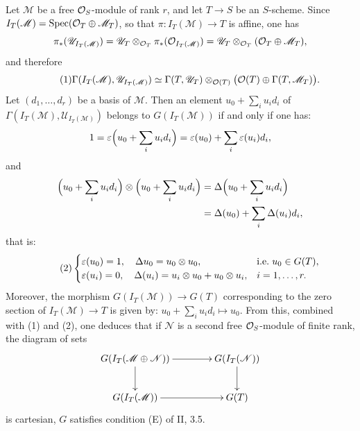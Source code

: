 Let $\mathscr M$ be a free $\mathcal{O}_S$-module of rank $r$, and let $T\to S$ be an $S$-scheme. Since $I_T(\mathscr M)=\operatorname{Spec}(\mathcal{O}_T\oplus\mathscr M_T)$, so that $\pi:I_T(\mathscr M)\to T$ is affine, one has
\[
\pi_*(\mathscr U_{I_T(\mathscr M)})=\mathscr U_T\otimes_{\mathcal{O}_T}\pi_*(\mathcal{O}_{I_T(\mathscr M)})=\mathscr U_T\otimes_{\mathcal{O}_T}(\mathcal{O}_T\oplus\mathscr M_T),
\]
and therefore
\begin{equation}\tag{1}
\Gamma(I_T(\mathscr M),\mathscr U_{I_T(\mathscr M)})\simeq\Gamma(T,\mathscr U_T)\otimes_{\mathcal{O}(T)}\bigl(\mathcal{O}(T)\oplus\Gamma(T,\mathscr M_T)\bigr).
\end{equation}
Let $(d_1,\ldots,d_r)$ be a basis of $\mathscr M$. Then an element $u_0+\sum_i u_id_i$ of $\Gamma(I_T(\mathscr M),\mathscr U_{I_T(\mathscr M)})$ belongs to $G(I_T(\mathscr M))$ if and only if one has:
\[
1=\varepsilon\Bigl(u_0+\sum_i u_id_i\Bigr)=\varepsilon(u_0)+\sum_i\varepsilon(u_i)d_i,
\]
and
\[
\begin{aligned}
\Bigl(u_0+\sum_i u_id_i\Bigr)\otimes\Bigl(u_0+\sum_i u_id_i\Bigr)
&=\Delta\Bigl(u_0+\sum_i u_id_i\Bigr)\\
&=\Delta(u_0)+\sum_i\Delta(u_i)d_i,
\end{aligned}
\]
that is:
\begin{equation}\tag{2}
\begin{cases}
\varepsilon(u_0)=1,\quad\Delta u_0=u_0\otimes u_0,&\text{i.e.\kern.3em$u_0\in G(T)$},\\
\varepsilon(u_i)=0,\quad\Delta(u_i)=u_i\otimes u_0+u_0\otimes u_i,&i=1,\ldots,r.
\end{cases}
\end{equation}
Moreover, the morphism $G(I_T(\mathscr M))\to G(T)$ corresponding to the zero section of $I_T(\mathscr M)\to T$ is given by: $u_0+\sum_i u_id_i\mapsto u_0$. From this, combined with (1) and (2), one deduces that if $\mathscr N$ is a second free $\mathcal{O}_S$-module of finite rank, the diagram of sets
\[
\xymatrix@C=4em{G(I_T(\mathscr M\oplus\mathscr N))\ar[r]\ar[d]&G(I_T(\mathscr N))\ar[d]\\
G(I_T(\mathscr M))\ar[r]&G(T)}
\]
is cartesian, \ie $G$ satisfies condition (E) of II, 3.5.

